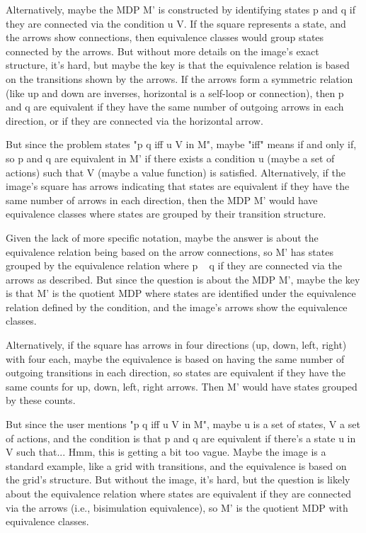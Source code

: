 Alternatively, maybe the MDP M' is constructed by identifying states p and q if they are connected via the condition u V. If the square represents a state, and the arrows show connections, then equivalence classes would group states connected by the arrows. But without more details on the image's exact structure, it's hard, but maybe the key is that the equivalence relation is based on the transitions shown by the arrows. If the arrows form a symmetric relation (like up and down are inverses, horizontal is a self-loop or connection), then p and q are equivalent if they have the same number of outgoing arrows in each direction, or if they are connected via the horizontal arrow.

But since the problem states "p q iff u V in M", maybe "iff" means if and only if, so p and q are equivalent in M' if there exists a condition u (maybe a set of actions) such that V (maybe a value function) is satisfied. Alternatively, if the image's square has arrows indicating that states are equivalent if they have the same number of arrows in each direction, then the MDP M' would have equivalence classes where states are grouped by their transition structure.

Given the lack of more specific notation, maybe the answer is about the equivalence relation being based on the arrow connections, so M' has states grouped by the equivalence relation where p ~ q if they are connected via the arrows as described. But since the question is about the MDP M', maybe the key is that M' is the quotient MDP where states are identified under the equivalence relation defined by the condition, and the image's arrows show the equivalence classes.

Alternatively, if the square has arrows in four directions (up, down, left, right) with four each, maybe the equivalence is based on having the same number of outgoing transitions in each direction, so states are equivalent if they have the same counts for up, down, left, right arrows. Then M' would have states grouped by these counts.

But since the user mentions "p q iff u V in M", maybe u is a set of states, V a set of actions, and the condition is that p and q are equivalent if there's a state u in V such that... Hmm, this is getting a bit too vague. Maybe the image is a standard example, like a grid with transitions, and the equivalence is based on the grid's structure. But without the image, it's hard, but the question is likely about the equivalence relation where states are equivalent if they are connected via the arrows (i.e., bisimulation equivalence), so M' is the quotient MDP with equivalence classes.

